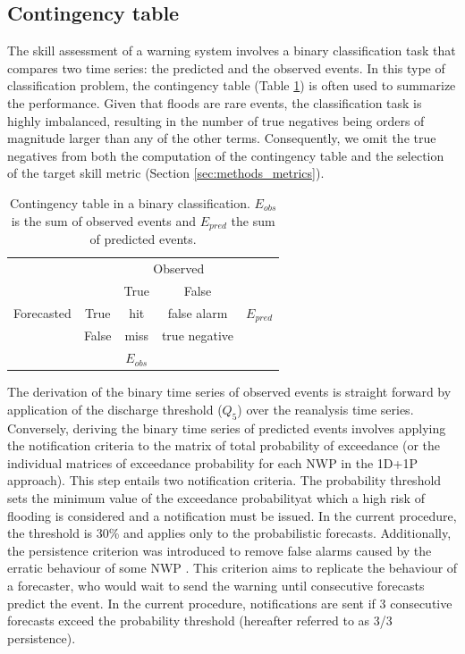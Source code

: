 \documentclass[preprint,12pt,authoryear]{elsarticle}
\begin{document}
\subsection{Contingency table}
\label{sec:methods_contingency}

The skill assessment of a warning system involves a binary classification task that compares two time series: the predicted and the observed events. In this type of classification problem, the contingency table (Table \ref{tab:contingency_table}) is often used to summarize the performance. Given that floods are rare events, the classification task is highly imbalanced, resulting in the number of true negatives being orders of magnitude larger than any of the other terms. Consequently, we omit the true negatives from both the computation of the contingency table and the selection of the target skill metric (Section \ref{sec:methods_metrics}). 

\begin{table}
    \centering
    \caption{Contingency table in a binary classification. $E_{obs}$ is the sum of observed events and $E_{pred}$ the sum of predicted events.}
    \footnotesize
    \begin{tabular}{ccccc}
        \toprule
        & & \multicolumn{2}{c}{Observed} & \\
        \cmidrule{3-4}
        & & True & False & \\
        \midrule
        Forecasted & True & hit & false alarm & $E_{pred}$ \\
        & False & miss & true negative & \\
        &  & $E_{obs}$ & & \\
        \bottomrule
    \end{tabular}
    \label{tab:contingency_table}
\end{table}

The derivation of the binary time series of observed events is straight forward by application of the discharge threshold ($Q_5$) over the reanalysis time series. Conversely, deriving the binary time series of predicted events involves applying the notification criteria to the matrix of total probability of exceedance (or the individual matrices of exceedance probability for each NWP in the 1D+1P approach).  This step entails two notification criteria. The probability threshold sets the minimum value of the exceedance probabilityat which a high risk of flooding is considered and a notification must be issued. In the current procedure, the threshold is 30\% and applies only to the probabilistic forecasts. Additionally, the persistence criterion was introduced to remove false alarms caused by the erratic behaviour of some NWP \cite{Bartholmes2009}. This criterion aims to replicate the behaviour of a forecaster, who would wait to send the warning until consecutive forecasts predict the event. In the current procedure, notifications are sent if 3 consecutive forecasts exceed the probability threshold (hereafter referred to as 3/3 persistence). 
\end{document}
